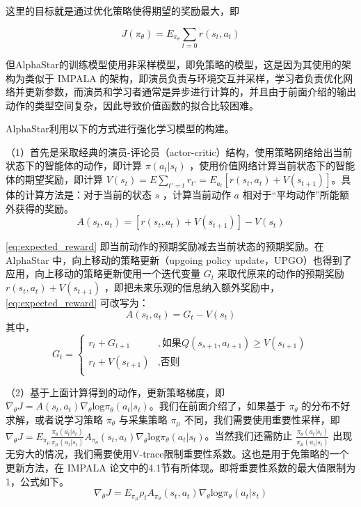 这里的目标就是通过优化策略使得期望的奖励最大，即

\begin{equation}
    \label{eq:}
    J(\pi_{\theta}) = E_{\pi_{\theta}} \sum_{t=0}r(s_t,a_t)
\end{equation}


但AlphaStar的训练模型使用非采样模型，即免策略的模型，这是因为其使用的架构为类似于 IMPALA 的架构，即演员负责与环境交互并采样，学习者负责优化网络并更新参数，而演员和学习者通常是异步进行计算的，并且由于前面介绍的输出动作的类型空间复杂，因此导致价值函数的拟合比较困难。

AlphaStar利用以下的方式进行强化学习模型的构建。

（1）首先是采取经典的演员-评论员（actor-critic）结构，使用策略网络给出当前状态下的智能体的动作，即计算 $\pi(a_t|s_t)$ ，使用价值网络计算当前状态下的智能体的期望奖励，即计算 $V(s_t) = E \sum_{t'=t}r_{t'} = E_{a_t}[r(s_t,a_t)+V(s_{t+1})]$。具体的计算方法是：对于当前的状态 $s$ ，计算当前动作 $a$ 相对于“平均动作”所能额外获得的奖励。
\begin{equation}
    \label{eq:expected_reward}
    A(s_t,a_t)=[r(s_t,a_t)+V(s_{t+1})]-V(s_t)
\end{equation}
        
\eqref{eq:expected_reward} 即当前动作的预期奖励减去当前状态的预期奖励。在 AlphaStar 中，向上移动的策略更新（upgoing policy update，UPGO）也得到了应用，向上移动的策略更新使用一个迭代变量 $G_t$ 来取代原来的动作的预期奖励 $r(s_t,a_t)+V(s_{t+1})$ ，即把未来乐观的信息纳入额外奖励中，\eqref{eq:expected_reward} 可改写为：
\begin{equation}
    \label{eq:}
    A(s_t,a_t)=G_t-V(s_t)
\end{equation}
其中，
\begin{equation}\nonumber
    \label{eq:}
    G_t=
    \begin{cases}
        r_t+G_{t+1} &, \text{如果} Q(s_{s+1},a_{t+1})\geqslant V(s_{t+1}) \\
        r_t+V(s_{t+1}) &, \text{否则} \\
    \end{cases}
\end{equation}

（2）基于上面计算得到的动作，更新策略梯度，即 $\nabla_{\theta}J = A(s_t,a_t)\nabla_{\theta}\mathrm{log} \pi_{\theta}(a_t|s_t)$。我们在前面介绍了，如果基于 $\pi_{\theta}$ 的分布不好求解，或者说学习策略 $\pi_{\theta}$ 与采集策略 $\pi_{\mu}$ 不同，我们需要使用重要性采样，即 $\nabla_{\theta}J = E_{\pi_{\mu}}\frac{\pi_{\theta} (a_t|s_t)}{\pi_{\mu} (a_t|s_t)} A_{\pi_{\theta}}(s_t,a_t)\nabla_{\theta}\mathrm{log} \pi_{\theta}(a_t|s_t)$。当然我们还需防止 $\frac{\pi_{\theta} (a_t|s_t)}{\pi_{\mu} (a_t|s_t)}$ 出现无穷大的情况，我们需要使用V-trace限制重要性系数。这也是用于免策略的一个更新方法，在 IMPALA 论文中的4.1节有所体现。即将重要性系数的最大值限制为1，公式如下。
\begin{equation}
    \label{eq:}
    \nabla_{\theta}J = E_{\pi_{\mu}}\rho_t A_{\pi_{\theta}}(s_t,a_t)\nabla_{\theta}\mathrm{log} \pi_{\theta}(a_t|s_t)
\end{equation}

